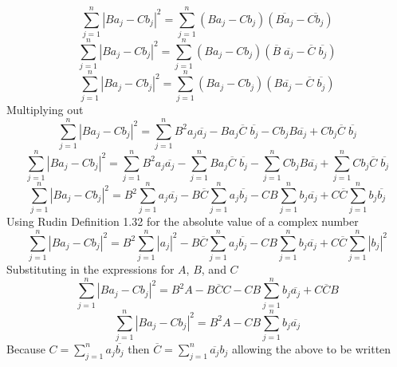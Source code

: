 \begin{proof-dan}
\begin{equation*}
    \sum_{j=1}^{n}|Ba_{j}-Cb_{j}|^{2}=\sum_{j=1}^{n}(Ba_{j}-Cb_{j})(\overline{Ba_{j}}-\overline{Cb_{j}})
  \end{equation*}
  \begin{equation*}
    \sum_{j=1}^{n}|Ba_{j}-Cb_{j}|^{2}=\sum_{j=1}^{n}(Ba_{j}-Cb_{j})(\overline{B}\;\overline{a_{j}}-\overline{C}\;\overline{b_{j}})
  \end{equation*}
  \begin{equation*}
    \sum_{j=1}^{n}|Ba_{j}-Cb_{j}|^{2}=\sum_{j=1}^{n}(Ba_{j}-Cb_{j})(B\overline{a_{j}}-\overline{C}\;\overline{b_{j}})
  \end{equation*}
  Multiplying out
  \begin{equation*}
    \sum_{j=1}^{n}|Ba_{j}-Cb_{j}|^{2}=\sum_{j=1}^{n}B^{2}a_{j}\overline{a_{j}}-Ba_{j}\overline{C}\;\overline{b_{j}}-Cb_{j}B\overline{a_{j}}+Cb_{j}\overline{C}\;\overline{b_{j}}
  \end{equation*}
  \begin{equation*}
    \sum_{j=1}^{n}|Ba_{j}-Cb_{j}|^{2}=\sum_{j=1}^{n}B^{2}a_{j}\overline{a_{j}}-\sum_{j=1}^{n}Ba_{j}\overline{C}\;\overline{b_{j}}-\sum_{j=1}^{n}Cb_{j}B\overline{a_{j}}+\sum_{j=1}^{n}Cb_{j}\overline{C}\;\overline{b_{j}}
  \end{equation*}
  \begin{equation*}
    \sum_{j=1}^{n}|Ba_{j}-Cb_{j}|^{2}=B^{2}\sum_{j=1}^{n}a_{j}\overline{a_{j}}-B\overline{C}\sum_{j=1}^{n}a_{j}\overline{b_{j}}-CB\sum_{j=1}^{n}b_{j}\overline{a_{j}}+C\overline{C}\sum_{j=1}^{n}b_{j}\overline{b_{j}}
  \end{equation*}
  Using Rudin Definition 1.32 for the absolute value of a complex number
  \begin{equation*}
    \sum_{j=1}^{n}|Ba_{j}-Cb_{j}|^{2}=B^{2}\sum_{j=1}^{n}|a_{j}|^{2}-B\overline{C}\sum_{j=1}^{n}a_{j}\overline{b_{j}}-CB\sum_{j=1}^{n}b_{j}\overline{a_{j}}+C\overline{C}\sum_{j=1}^{n}|b_{j}|^{2}
  \end{equation*}
  Substituting in the expressions for $A$, $B$, and $C$
  \begin{equation*}
    \sum_{j=1}^{n}|Ba_{j}-Cb_{j}|^{2}=B^{2}A-B\overline{C}C-CB\sum_{j=1}^{n}b_{j}\overline{a_{j}}+C\overline{C}B
  \end{equation*}
  \begin{equation*}
    \sum_{j=1}^{n}|Ba_{j}-Cb_{j}|^{2}=B^{2}A-CB\sum_{j=1}^{n}b_{j}\overline{a_{j}}
  \end{equation*}
  Because $C=\sum_{j=1}^{n}a_{j}\overline{b_{j}}$ then $\overline{C}=\sum_{j=1}^{n}\overline{a_{j}}{b}_{j}$ allowing the above to be written

\end{proof-dan}
